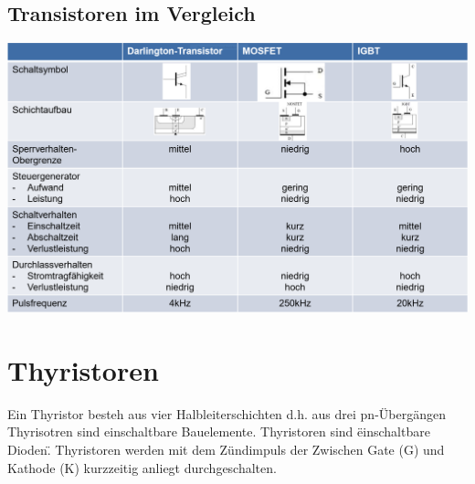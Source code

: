 \subsection{Transistoren im Vergleich}
\includegraphics[width=\linewidth]{images/transdiff}
%    
%    
\begin{minipage}{0.7\linewidth}
\section{Thyristoren}
Ein Thyristor besteh aus vier Halbleiterschichten d.h. aus drei pn-Übergängen\newline
Thyrisotren sind einschaltbare Bauelemente.\newline
Thyristoren sind  \" einschaltbare Dioden\". Thyristoren werden mit dem Zündimpuls der Zwischen Gate (G) und Kathode (K) kurzzeitig anliegt durchgeschalten.
\end{minipage}
